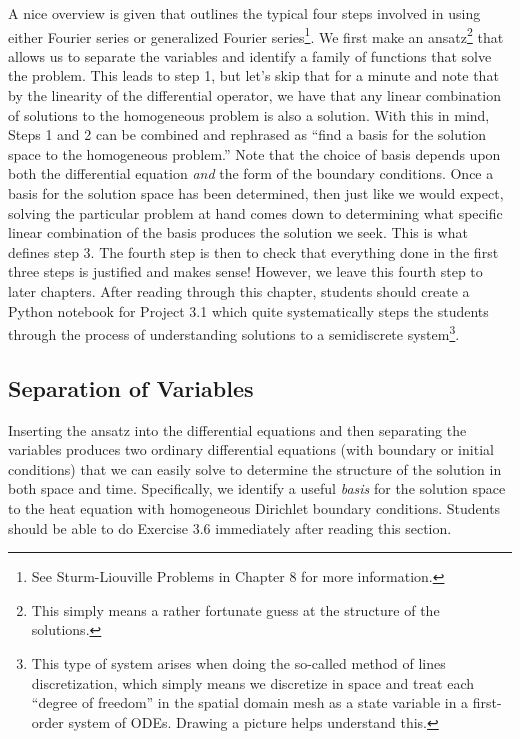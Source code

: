 \documentclass{amsart}
\theoremstyle{plain}
\theoremstyle{definition}
\theoremstyle{remark}
\theoremstyle{definition}
\numberwithin{equation}{section}
\numberwithin{equation}{section}
\begin{document}
A nice overview is given that outlines the typical four steps involved in using either Fourier series or generalized Fourier series\footnote{See Sturm-Liouville Problems in Chapter 8 for more information.}.
We first make an ansatz\footnote{This simply means a rather fortunate guess at the structure of the solutions.} that allows us to separate the variables and identify a family of functions that solve the problem. 
This leads to step 1, but let's skip that for a minute and note that by the linearity of the differential operator, we have that any linear combination of solutions to the homogeneous problem is also a solution. 
With this in mind, Steps 1 and 2 can be combined and rephrased as ``find a basis for the solution space to the homogeneous problem.''
Note that the choice of basis depends upon both the differential equation {\em and} the form of the boundary conditions.
Once a basis for the solution space has been determined, then just like we would expect, solving the particular problem at hand comes down to determining what specific linear combination of the basis produces the solution we seek.
This is what defines step 3.
The fourth step is then to check that everything done in the first three steps is justified and makes sense!
However, we leave this fourth step to later chapters. 
After reading through this chapter, students should create a Python notebook for Project 3.1 which quite systematically steps the students through the process of understanding solutions to a semidiscrete system\footnote{This type of system arises when doing the so-called method of lines discretization, which simply means we discretize in space and treat each ``degree of freedom'' in the spatial domain mesh as a state variable in a first-order system of ODEs. Drawing a picture helps understand this.}. 

\subsection{Separation of Variables}

Inserting the ansatz into the differential equations and then separating the variables produces two ordinary differential equations (with boundary or initial conditions) that we can easily solve to determine the structure of the solution in both space and time. 
Specifically, we identify a useful {\em basis} for the solution space to the heat equation with homogeneous Dirichlet boundary conditions. 
Students should be able to do Exercise 3.6 immediately after reading this section. 
\end{document}
